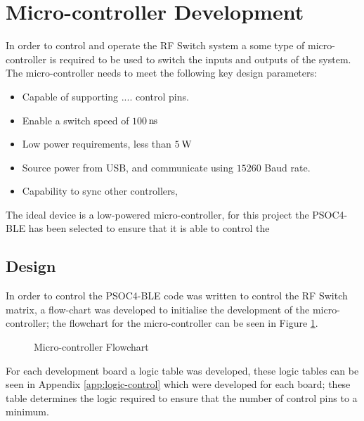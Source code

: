 \documentclass[12pt,openany,a4paper]{book}
\newcommand{\pack}	{\hspace{-0.08em}}
\newcommand{\ns}	{\ensuremath{\rm\,n\pack s}}
\newcommand{\W}		{\ensuremath{\rm\,W}}
\begin{document}
\section{Micro-controller Development}		\label{sec:micro_dev}
In order to control and operate the RF Switch system a some type of micro-controller is required to be used to switch the inputs and outputs of the system. The micro-controller needs to meet the following key design parameters:
\begin{itemize}
	\setlength\itemsep{-0.5em}
	\item Capable of supporting .... control pins.
	\item Enable a switch speed of $100$\ns
	\item Low power requirements, less than $5$\W
	\item Source power from USB, and communicate using $15260$ Baud rate.
	\item Capability to sync other controllers, 
\end{itemize}
The ideal device is a low-powered micro-controller, for this project the PSOC4-BLE has been selected to ensure that it is able to control the 


\subsection{Design}
In order to control the PSOC4-BLE code was written to control the RF Switch matrix, a flow-chart was developed to initialise the development of the micro-controller; the flowchart for the micro-controller can be seen in Figure \ref{fig:micro-flowchart}.
\begin{figure}[H]
	\centering
	\caption{Micro-controller Flowchart}
	\label{fig:micro-flowchart}
\end{figure} 


For each development board a logic table was developed, these logic tables can be seen in Appendix \ref{app:logic-control} which were developed for each board; these table determines the logic required to ensure that the number of control pins to a minimum.
\end{document}
